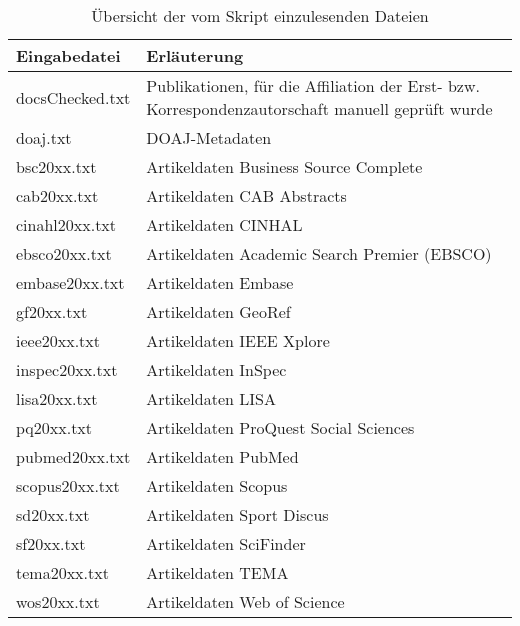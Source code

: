 \begin{appendices}
\begin{table}[h]
\caption{Übersicht der vom Skript einzulesenden Dateien}
    \begin{tabularx}{1\textwidth}{p{5cm}p{9cm}}
    \toprule
     Eingabedatei & Erläuterung \\
     \midrule
     docsChecked.txt & Publikationen, für die Affiliation der Erst- bzw. Korrespondenzautorschaft manuell geprüft wurde \\
    doaj.txt & DOAJ-Metadaten \\
    \midrule
    bsc20xx.txt & Artikeldaten Business Source Complete \\
    cab20xx.txt & Artikeldaten CAB Abstracts \\
    cinahl20xx.txt & Artikeldaten CINHAL \\
    ebsco20xx.txt & Artikeldaten Academic Search Premier (EBSCO) \\
    embase20xx.txt & Artikeldaten Embase \\
    gf20xx.txt & Artikeldaten GeoRef \\
    ieee20xx.txt & Artikeldaten IEEE Xplore \\
    inspec20xx.txt & Artikeldaten InSpec \\
    lisa20xx.txt & Artikeldaten LISA \\
    pq20xx.txt & Artikeldaten ProQuest Social Sciences \\
    pubmed20xx.txt & Artikeldaten PubMed \\
    scopus20xx.txt & Artikeldaten Scopus \\
    sd20xx.txt & Artikeldaten Sport Discus \\
    sf20xx.txt & Artikeldaten SciFinder \\
    tema20xx.txt & Artikeldaten TEMA \\
    wos20xx.txt & Artikeldaten Web of Science \\
    \bottomrule
    \end{tabularx}
\end{table}


\end{appendices}

